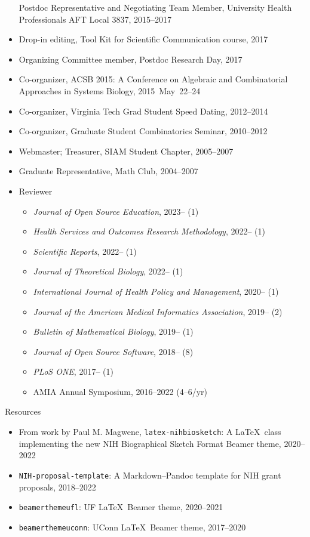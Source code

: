 \documentclass[10pt,a4paper]{article}
\begin{document}
\begin{itemize}[label=$\circ$,nolistsep]
Postdoc Representative and Negotiating Team Member, University Health Professionals AFT Local 3837, 2015--2017
\item
Drop-in editing, Tool Kit for Scientific Communication course, 2017
\item
Organizing Committee member, Postdoc Research Day, 2017
\item
Co-organizer, ACSB 2015: A Conference on Algebraic and Combinatorial Approaches in Systems Biology, 2015~May~22--24
\item
Co-organizer, Virginia Tech Grad Student Speed Dating, 2012--2014
\item
Co-organizer, Graduate Student Combinatorics Seminar, 2010--2012
\item
Webmaster; Treasurer, SIAM Student Chapter, 2005--2007
\item
Graduate Representative, Math Club, 2004--2007
\item
Reviewer
\begin{itemize}[label=$\circ$,nolistsep]
\item
{\itshape Journal of Open Source Education}, 2023-- (1)
\item
{\itshape Health Services and Outcomes Research Methodology}, 2022-- (1)
\item
{\itshape Scientific Reports}, 2022-- (1)
\item
{\itshape Journal of Theoretical Biology}, 2022-- (1)
\item
{\itshape International Journal of Health Policy and Management}, 2020-- (1)
\item
{\itshape Journal of the American Medical Informatics Association}, 2019-- (2)
\item
{\itshape Bulletin of Mathematical Biology}, 2019-- (1)
\item
{\itshape Journal of Open Source Software}, 2018-- (8)
\item
{\itshape PLoS ONE}, 2017-- (1)
\item
AMIA Annual Symposium, 2016--2022 (4--6/yr)
\end{itemize}
\end{itemize}

\vspace{.25cm}
{\sc Resources}
\begin{itemize}[label=$\circ$,nolistsep]
\item
From work by Paul M. Magwene, {\tt\small latex-nihbiosketch}: A \LaTeX\ class implementing the new NIH Biographical Sketch Format {\sffamily Beamer} theme, 2020--2022
\item
{\tt\small NIH-proposal-template}: A Markdown--Pandoc template for NIH grant proposals, 2018--2022
\item
{\tt\small beamerthemeufl}: UF \LaTeX\ {\sffamily Beamer} theme, 2020--2021
\item
{\tt\small beamerthemeuconn}: UConn \LaTeX\ {\sffamily Beamer} theme, 2017--2020
\end{itemize}
\end{document}
